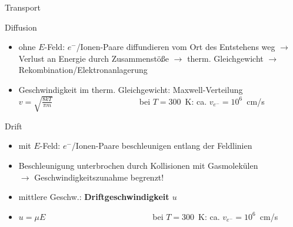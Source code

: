 \begin{frame}{Transport}
	\begin{block}{Diffusion}
	\begin{itemize}
		  \item ohne $E$-Feld: $e^-$/Ionen-Paare diffundieren vom Ort des Entstehens weg $\rightarrow$
		  Verlust an Energie durch Zusammenstöße $\rightarrow$ therm. Gleichgewicht $\rightarrow$
		  Rekombination/Elektronanlagerung
		  \item Geschwindigkeit im therm. Gleichgewicht: Maxwell-Verteilung\\
		  		$v=\sqrt{\frac{8kT}{\pi m}}$~~~~~~~~~~~~~~~~~~~~~bei $T=300$~K: ca. $v_{e^-}=10^6$~cm/s
		\end{itemize}
	\end{block}
	
	\begin{block}{Drift}
	\begin{itemize}
		  \item mit $E$-Feld: $e^-$/Ionen-Paare beschleunigen entlang der Feldlinien
		  \item Beschleunigung unterbrochen durch Kollisionen mit Gasmolekülen\\
		  		$\rightarrow$ Geschwindigkeitszunahme begrenzt!
		  \item mittlere Geschw.: \textbf{Driftgeschwindigkeit $u$}
		  \item $u=\mu E$~~~~~~~~~~~~~~~~~~~~~~~~~~bei $T=300$~K: ca. $v_{e^-}=10^6$~cm/s
		\end{itemize}
	\end{block}
\end{frame}

